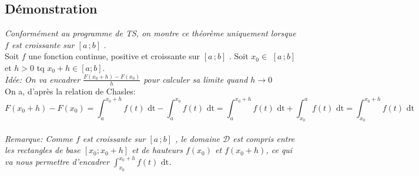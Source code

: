 \documentclass[12px]{article}
\newcommand\I{$[a\,;b]$ }
\newcommand\xo{x_{0} }
\newcommand\dt{f(t)\,\,\mathrm{dt}}
\begin{document}
	\subsection{Démonstration}
	\emph{Conformément au programme de TS, on montre ce théorème uniquement lorsque $f$ est croissante sur \I}.\\
	
	Soit $f$ une fonction continue, positive et croissante sur \I.
	Soit $\xo \in$ \I et $h>0$ tq $\xo+h \in [a;b]$.\\
	
	\emph{Idée: On va encadrer $\frac{F( \xo +h) - F(\xo) }{h}$ pour calculer sa limite quand $h \rightarrow 0$}\\
		
	On a, d'après la relation de Chasles:\\
	\begin{displaymath}
		F( \xo +h ) - F(\xo) = \int_{a}^{\xo +h}\dt - \int_{a}^{\xo}\dt = 
		\int_{a}^{ \xo +h }\dt + \int_{\xo}^{a}\dt = \int_{\xo}^{\xo +h}\dt
	\end{displaymath}
	\\
		
	\emph
	{
	Remarque: Comme $f$ est croissante sur \I, le domaine $\mathcal{D}$ est compris entre les rectangles de base $[\xo; \xo +h]$ et de hauteurs $f(\xo)$ et $f(\xo +h)$, ce qui va nous permettre d'encadrer $\int_{\xo}^{\xo +h}\dt$.
	}
	
\end{document}
